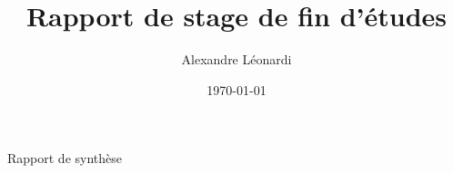 \documentclass[10pt]{article}
\title{Rapport de stage de fin d'études}
\author{Alexandre Léonardi}
\date{\today}
\begin{document}
\begin{titlepage}
\maketitle
\end{titlepage}

\linespread{1.15} %


\pagebreak
\clearpage
\vspace*{\fill}
\begin{center}
\begin{minipage}{.6\textwidth}
\Huge Rapport de synthèse
\end{minipage}
\end{center}
\vfill %
\clearpage
\pagebreak

\pagebreak

\pagebreak

\pagebreak

\pagebreak

\pagebreak

\pagebreak



\end{document}
